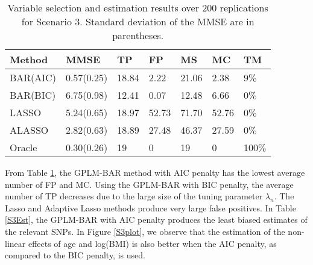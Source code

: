 \documentclass[11pt]{article}
\begin{document}
\begin{table}[H]
\centering
\caption{Variable selection and estimation results over 200 replications for Scenario 3. Standard deviation of the MMSE are in parentheses.} \label{S3}
\begin{tabular}{l |llllll}
\hline
Method & MMSE & TP & FP & MS & MC & TM \\
\hline
BAR(AIC) & 0.57(0.25) & 18.84 & 2.22 & 21.06 & 2.38 & 9$\%$ \\
BAR(BIC) & 6.75(0.98)& 12.41 & 0.07 & 12.48 & 6.66 & 0$\%$\\
LASSO & 5.24(0.65) & 18.97 & 52.73 & 71.70 & 52.76 & 0$\%$\\
ALASSO & 2.82(0.63) & 18.89 & 27.48 & 46.37 & 27.59 &  0$\%$\\
Oracle & 0.30(0.26) & 19 & 0 & 19 & 0 & 100$\%$\\
\hline
\end{tabular}
\end{table}
From Table \ref{S3}, the GPLM-BAR method with AIC penalty has the lowest average number of FP and MC. Using the GPLM-BAR with BIC penalty, the average number of TP decreases due to the large size of the tuning parameter $\lambda_n$. The Lasso and Adaptive Lasso methods produce very large false positives. In Table \ref{S3Est}, the GPLM-BAR with AIC penalty produces the least biased estimates of the relevant SNPs. In Figure \ref{S3plot}, we observe that the estimation of the non-linear effects of age and log(BMI) is also better when the AIC penalty, as compared to the BIC penalty, is used. 
\end{document}
